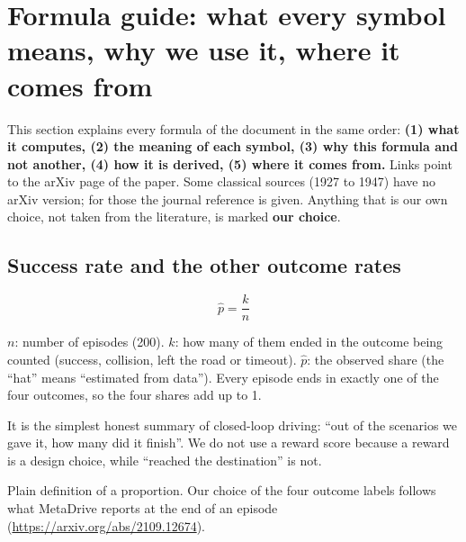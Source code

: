 \section{Formula guide: what every symbol means, why we use it, where it comes from}\label{sec:formulas}
\begin{plainwords}
This section explains every formula of the document in the same order: \textbf{(1) what it computes, (2) the meaning of each symbol, (3) why this formula and not another, (4) how it is derived, (5) where it comes from.} Links point to the arXiv page of the paper. Some classical sources (1927 to 1947) have no arXiv version; for those the journal reference is given. Anything that is our own choice, not taken from the literature, is marked \textbf{our choice}.
\end{plainwords}

\subsection{Success rate and the other outcome rates}
\[\hat p=\frac{k}{n}\]
\begin{description}[leftmargin=2.6cm,style=nextline]
\item[Symbols] $n$: number of episodes (200). $k$: how many of them ended in the outcome being counted (success, collision, left the road or timeout). $\hat p$: the observed share (the ``hat'' means ``estimated from data''). Every episode ends in exactly one of the four outcomes, so the four shares add up to 1.
\item[Why] It is the simplest honest summary of closed-loop driving: ``out of the scenarios we gave it, how many did it finish''. We do not use a reward score because a reward is a design choice, while ``reached the destination'' is not.
\item[Source] Plain definition of a proportion. Our choice of the four outcome labels follows what MetaDrive reports at the end of an episode (\url{https://arxiv.org/abs/2109.12674}).
\end{description}

